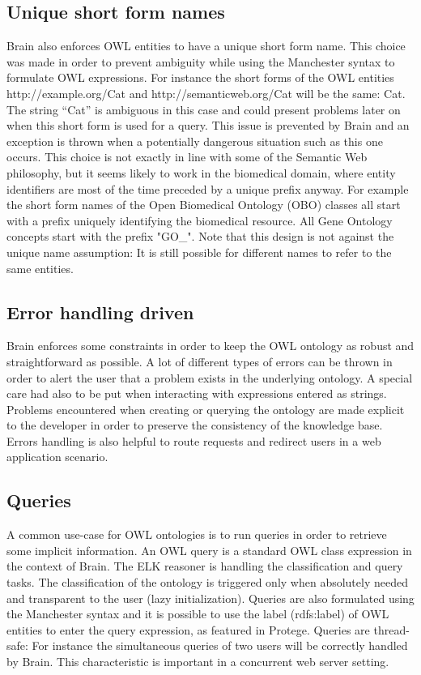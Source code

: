 \documentclass{llncs}
\begin{document}
\subsection{Unique short form names}
Brain also enforces OWL entities to have a unique short form name. This choice was made in order to prevent ambiguity while using 
the Manchester syntax to formulate OWL expressions. For instance the short forms of the OWL entities http://example.org/Cat and
http://semanticweb.org/Cat will be the same: Cat. The string ``Cat'' is ambiguous in this case and could present problems later on when this
short form is used for a query.
This issue is prevented by Brain and an exception is thrown 
when a potentially dangerous situation such as this one occurs. 
This choice is not exactly in line with some of the Semantic Web philosophy, but it
seems likely to work in the biomedical domain, where entity identifiers are most of the time preceded by a unique prefix anyway. For example
the short form names of the Open Biomedical Ontology (OBO) classes all start with a prefix uniquely identifying the biomedical resource.
All Gene Ontology concepts start with the prefix "GO\_".
Note that this design is not against the unique name assumption: It is still possible for different names to refer to the same entities.

\subsection{Error handling driven}
Brain enforces some constraints in order to keep the OWL ontology as robust and straightforward as possible. 
A lot of different types of errors
can be thrown in order to alert the user that a problem exists in the underlying ontology. 
A special care had also to be put when interacting with expressions entered as strings. Problems encountered when creating or querying
the ontology are made explicit to the developer in order to preserve the consistency of the knowledge base. Errors handling is also helpful
to route requests and redirect users in a web application scenario.

\subsection{Queries}
A common use-case for OWL ontologies is to run queries in order to retrieve some implicit information. An OWL query is a
standard OWL class expression in the context of Brain. The ELK reasoner is handling the classification and query tasks. The classification
of the ontology is triggered only when absolutely needed and transparent to the user (lazy initialization). Queries are also formulated
using the Manchester syntax and it is possible to use the label (rdfs:label) of OWL entities to enter the query expression, as featured
in Protege. Queries are thread-safe: For instance the simultaneous queries of two users will be correctly handled by Brain.
This characteristic is important in a concurrent web server setting.
\end{document}
